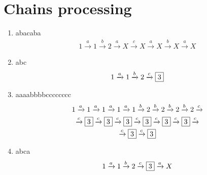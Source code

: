 \documentclass[12pt]{article}
\begin{document}
\section* {Chains processing} 
\begin {enumerate} 
\item abacaba
\begin {equation*} 
\begin {gathered} 
1 \xrightarrow{a} 1 \xrightarrow{b} 2 \xrightarrow{a} X \xrightarrow{c} X \xrightarrow{a} X \xrightarrow{b} X \xrightarrow{a} X
\end {gathered} 
\end {equation*} 

\item abc
\begin {equation*} 
\begin {gathered} 
1 \xrightarrow{a} 1 \xrightarrow{b} 2 \xrightarrow{c} \fbox{3}
\end {gathered} 
\end {equation*} 

\item aaaabbbbcccccccc
\begin {equation*} 
\begin {gathered} 
1 \xrightarrow{a} 1 \xrightarrow{a} 1 \xrightarrow{a} 1 \xrightarrow{a} 1 \xrightarrow{b} 2 \xrightarrow{b} 2 \xrightarrow{b} 2 \xrightarrow{b} 2 \xrightarrow{c} \\
 \xrightarrow{c} \fbox{3} \xrightarrow{c} \fbox{3} \xrightarrow{c} \fbox{3} \xrightarrow{c} \fbox{3} \xrightarrow{c} \fbox{3} \xrightarrow{c} \fbox{3} \xrightarrow{c} \\
 \xrightarrow{c} \fbox{3} \xrightarrow{c} \fbox{3}
\end {gathered} 
\end {equation*} 

\item abca
\begin {equation*} 
\begin {gathered} 
1 \xrightarrow{a} 1 \xrightarrow{b} 2 \xrightarrow{c} \fbox{3} \xrightarrow{a} X
\end {gathered} 
\end {equation*} 

\end {enumerate}
\end{document}
